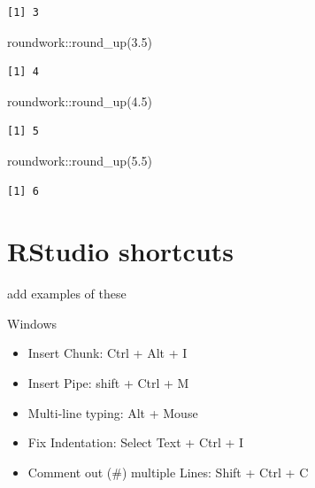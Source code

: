 \documentclass[
  letterpaper,
  DIV=11,
  numbers=noendperiod]{scrreprt}
\newenvironment{Shaded}{\begin{snugshade}}{\end{snugshade}}
\newcommand{\FloatTok}[1]{\textcolor[rgb]{0.68,0.00,0.00}{#1}}
\newcommand{\FunctionTok}[1]{\textcolor[rgb]{0.28,0.35,0.67}{#1}}
\newcommand{\NormalTok}[1]{\textcolor[rgb]{0.00,0.23,0.31}{#1}}
\newcommand{\SpecialCharTok}[1]{\textcolor[rgb]{0.37,0.37,0.37}{#1}}
\providecommand{\tightlist}{%
  \setlength{\itemsep}{0pt}\setlength{\parskip}{0pt}}\usepackage{longtable,booktabs,array}
\begin{document}
\begin{verbatim}
[1] 3
\end{verbatim}

\begin{Shaded}
\begin{Highlighting}[]
\NormalTok{roundwork}\SpecialCharTok{::}\FunctionTok{round\_up}\NormalTok{(}\FloatTok{3.5}\NormalTok{)}
\end{Highlighting}
\end{Shaded}

\begin{verbatim}
[1] 4
\end{verbatim}

\begin{Shaded}
\begin{Highlighting}[]
\NormalTok{roundwork}\SpecialCharTok{::}\FunctionTok{round\_up}\NormalTok{(}\FloatTok{4.5}\NormalTok{)}
\end{Highlighting}
\end{Shaded}

\begin{verbatim}
[1] 5
\end{verbatim}

\begin{Shaded}
\begin{Highlighting}[]
\NormalTok{roundwork}\SpecialCharTok{::}\FunctionTok{round\_up}\NormalTok{(}\FloatTok{5.5}\NormalTok{)}
\end{Highlighting}
\end{Shaded}

\begin{verbatim}
[1] 6
\end{verbatim}

\section{RStudio shortcuts}\label{rstudio-shortcuts}

\TODO add examples of these

Windows

\begin{itemize}
\tightlist
\item
  Insert Chunk: Ctrl + Alt + I
\item
  Insert Pipe: shift + Ctrl + M
\item
  Multi-line typing: Alt + Mouse
\item
  Fix Indentation: Select Text + Ctrl + I
\item
  Comment out (\#) multiple Lines: Shift + Ctrl + C
\end{itemize}
\end{document}
